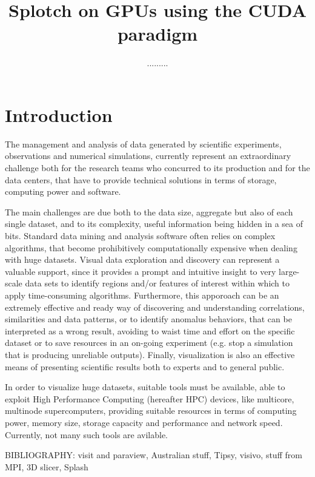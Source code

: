 \documentclass[11pt]{article}
\title{Splotch on GPUs using the CUDA paradigm}
\author{.........}
\begin{document}
\maketitle

\section{Introduction}

The management and analysis of data generated by scientific experiments, 
observations and numerical simulations, currently represent an extraordinary challenge  
both for the research teams who concurred to its production and for 
the data centers, that have to provide technical solutions in terms of 
storage, computing power and software.

The main challenges are due both to the data size, aggregate but also of each 
single dataset, and to its complexity, useful information being hidden in a sea 
of bits. Standard data mining and analysis software often relies on complex
algorithms, that become prohibitively computationally expensive when dealing with 
huge datasets. Visual data exploration and discovery can represent a valuable
support, since it provides a prompt and intuitive insight to
very large-scale data sets to identify regions and/or features of interest within which
to apply time-consuming algorithms. 
Furthermore, this apporoach can be an extremely effective and ready way of discovering 
and understanding correlations,
similarities and data patterns, or to identify anomalus behaviors, that can be
interpreted as a wrong result, avoiding to waist time and effort on the specific dataset or
to save resources in an on-going experiment (e.g. stop a simulation that is producing 
unreliable outputs). Finally, visualization is also an effective means of presenting
scientific results both to experts and to general public.

In order to visualize huge datasets, suitable tools must be available, able to 
exploit High Performance Computing (hereafter HPC) devices, like multicore, multinode
supercomputers, providing suitable resources in terms of computing power, memory size, 
storage capacity and performance and network speed. Currently, not many such tools are avilable.

BIBLIOGRAPHY: visit and paraview, Australian stuff, Tipsy, visivo, stuff from MPI, 3D slicer, Splash
\end{document}
